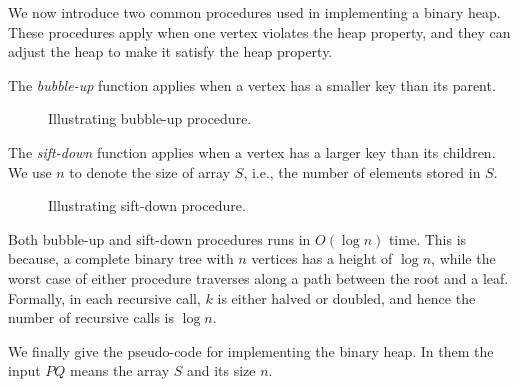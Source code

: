 We now introduce two common procedures used in implementing a binary heap.
These procedures apply when one vertex violates the heap property,
and they can adjust the heap to make it satisfy the heap property.

The \emph{bubble-up} function applies when a vertex has a smaller key than its parent.

\begin{algorithmblock}[0.8\textwidth]
	\xxx
	\xxx
	\xxx
	\xxx
	\xxx
	\xxx
\end{algorithmblock}

\begin{figure}[h!]
\centering{}
\caption{Illustrating bubble-up procedure.}
\end{figure}


The \emph{sift-down} function applies when a vertex has a larger key than its children.
We use $n$ to denote the size of array $S$, i.e., the number of elements stored in $S$.

\begin{algorithmblock}[0.8\textwidth]
	\xxx
	\xxx
	\xxx
	\xxx
	\xxx
	\xxx
	\xxx
\end{algorithmblock}

\begin{figure}[h!]
\centering{}
\caption{Illustrating sift-down procedure.}
\end{figure}

Both bubble-up and sift-down procedures runs in $O(\log n)$ time.
This is because, a complete binary tree with $n$ vertices has a height of $\log n$, while
the worst case of either procedure traverses along a path between the root and a leaf.
Formally, in each recursive call, $k$ is either halved or doubled, and hence the number
of recursive calls is $\log n$.



We finally give the pseudo-code for implementing the binary heap.
In them the input $PQ$ means the array $S$ and its size $n$.

